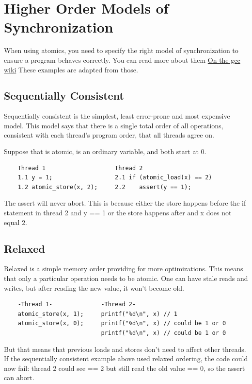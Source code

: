 \section{Higher Order Models of Synchronization}

When using atomics, you need to specify the right model of synchronization to ensure a program behaves correctly.
You can read more about them \href{https://gcc.gnu.org/wiki/Atomic/GCCMM/AtomicSync}{On the gcc wiki}
These examples are adapted from those.

\subsection{Sequentially Consistent}

Sequentially consistent is the simplest, least error-prone and most expensive model.
This model says that there is a single total order of all operations, consistent with each thread's program order, that all threads agree on.

Suppose that  is atomic,  is an ordinary variable, and both start at 0.

\begin{verbatim}
    Thread 1                    Thread 2
    1.1 y = 1;                  2.1 if (atomic_load(x) == 2)
    1.2 atomic_store(x, 2);     2.2    assert(y == 1);
\end{verbatim}

The assert will never abort.
This is because either the store happens before the if statement in thread 2 and y == 1 or the store happens after and x does not equal 2.

\subsection{Relaxed}

Relaxed is a simple memory order providing for more optimizations.
This means that only a particular operation needs to be atomic.
One can have stale reads and writes, but after reading the new value, it won't become old.

\begin{verbatim}
    -Thread 1-              -Thread 2-
    atomic_store(x, 1);     printf("%d\n", x) // 1
    atomic_store(x, 0);     printf("%d\n", x) // could be 1 or 0
                            printf("%d\n", x) // could be 1 or 0
\end{verbatim}

But that means that previous loads and stores don't need to affect other threads.
If the sequentially consistent example above used relaxed ordering, the code could now fail: thread 2 could see  == 2 but still read the old value  == 0, so the assert can abort.

